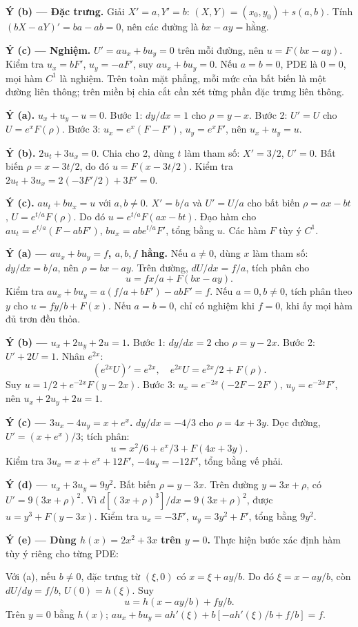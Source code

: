 \textbf{Ý (b) — Đặc trưng.} Giải $X'=a,Y'=b$: $(X,Y)=(x_0,y_0)+s(a,b)$. Tính $(bX-aY)'=ba-ab=0$, nên các đường là $bx-ay=\text{hằng}$.

\textbf{Ý (c) — Nghiệm.} $U'=au_x+bu_y=0$ trên mỗi đường, nên $u=F(bx-ay)$. Kiểm tra $u_x=bF'$, $u_y=-aF'$, suy $au_x+bu_y=0$. Nếu $a=b=0$, PDE là $0=0$, mọi hàm $C^1$ là nghiệm. Trên toàn mặt phẳng, mỗi mức của bất biến là một đường liên thông; trên miền bị chia cắt cần xét từng phần đặc trưng liên thông.

\textbf{Ý (a).} $u_x+u_y-u=0$. Bước 1: $dy/dx=1$ cho $\rho=y-x$. Bước 2: $U'=U$ cho $U=e^xF(\rho)$. Bước 3: $u_x=e^x(F-F')$, $u_y=e^xF'$, nên $u_x+u_y=u$.

\textbf{Ý (b).} $2u_t+3u_x=0$. Chia cho 2, dùng $t$ làm tham số: $X'=3/2$, $U'=0$. Bất biến $\rho=x-3t/2$, do đó $u=F(x-3t/2)$. Kiểm tra $2u_t+3u_x=2(-3F'/2)+3F'=0$.

\textbf{Ý (c).} $au_t+bu_x=u$ với $a,b\ne0$. $X'=b/a$ và $U'=U/a$ cho bất biến $\rho=ax-bt$, $U=e^{t/a}F(\rho)$. Do đó $u=e^{t/a}F(ax-bt)$. Đạo hàm cho $au_t=e^{t/a}(F-abF')$, $bu_x=ab e^{t/a}F'$, tổng bằng $u$. Các hàm $F$ tùy ý $C^1$.

\textbf{Ý (a) — $au_x+bu_y=f$, $a,b,f$ hằng.} Nếu $a\ne0$, dùng $x$ làm tham số: $dy/dx=b/a$, nên $\rho=bx-ay$. Trên đường, $dU/dx=f/a$, tích phân cho
\[u=fx/a+F(bx-ay).\]
Kiểm tra $au_x+bu_y=a(f/a+bF')-abF'=f$. Nếu $a=0,b\ne0$, tích phân theo $y$ cho $u=fy/b+F(x)$. Nếu $a=b=0$, chỉ có nghiệm khi $f=0$, khi ấy mọi hàm đủ trơn đều thỏa.

\textbf{Ý (b) — $u_x+2u_y+2u=1$.} Bước 1: $dy/dx=2$ cho $\rho=y-2x$. Bước 2: $U'+2U=1$. Nhân $e^{2x}$:
\[(e^{2x}U)'=e^{2x},\quad e^{2x}U=e^{2x}/2+F(\rho).\]
Suy $u=1/2+e^{-2x}F(y-2x)$. Bước 3: $u_x=e^{-2x}(-2F-2F')$, $u_y=e^{-2x}F'$, nên $u_x+2u_y+2u=1$.

\textbf{Ý (c) — $3u_x-4u_y=x+e^x$.} $dy/dx=-4/3$ cho $\rho=4x+3y$. Dọc đường, $U'=(x+e^x)/3$; tích phân:
\[u=x^2/6+e^x/3+F(4x+3y).\]
Kiểm tra $3u_x=x+e^x+12F'$, $-4u_y=-12F'$, tổng bằng vế phải.

\textbf{Ý (d) — $u_x+3u_y=9y^2$.} Bất biến $\rho=y-3x$. Trên đường $y=3x+\rho$, có $U'=9(3x+\rho)^2$. Vì $d[(3x+\rho)^3]/dx=9(3x+\rho)^2$, được $u=y^3+F(y-3x)$. Kiểm tra $u_x=-3F'$, $u_y=3y^2+F'$, tổng bằng $9y^2$.

\textbf{Ý (e) — Dùng $h(x)=2x^2+3x$ trên $y=0$.} Thực hiện bước xác định hàm tùy ý riêng cho từng PDE:

Với (a), nếu $b\ne0$, đặc trưng từ $(\xi,0)$ có $x=\xi+ay/b$. Do đó $\xi=x-ay/b$, còn $dU/dy=f/b$, $U(0)=h(\xi)$. Suy
\[u=h(x-ay/b)+fy/b.\]
Trên $y=0$ bằng $h(x)$; $au_x+bu_y=ah'(\xi)+b[-ah'(\xi)/b+f/b]=f$.

